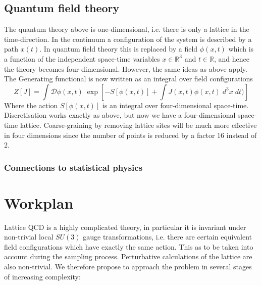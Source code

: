 \documentclass[11pt]{article}
\renewcommand{\vec}[1]{{#1}}
\begin{document}
\subsection{Quantum field theory}\label{sec:QFT}
The quantum theory above is one-dimensional, i.e. there is only a lattice in the time-direction. In the continuum a configuration of the system is described by a path $x(t)$. In quantum field theory this is replaced by a field $\phi(\vec{x},t)$ which is a function of the independent space-time variables $\vec{x}\in\mathbb{R}^3$ and $t\in\mathbb{R}$, and hence the theory becomes four-dimensional. However, the same ideas as above apply. The Generating functional is now written as an integral over field configurations
\begin{equation}
Z[J] = \int\mathcal{D}\phi(\vec{x},t)\;\exp\left[-S[\phi(\vec{x},t)]+\int
  J(\vec{x},t)\phi(\vec{x},t)\;d^3\vec{x}\;dt)\right]
\end{equation}
Where the action $S[\phi(\vec{x},t)]$ is an integral over four-dimensional space-time. Discretisation works exactly as above, but now we have a four-dimensional space-time lattice. Coarse-graining by removing lattice sites will be much more effective in four dimensions since the number of points is reduced by a factor 16 instead of 2.
\subsubsection{Connections to statistical physics}

\section{Workplan}
Lattice QCD is a highly complicated theory, in particular it is invariant under non-trivial local $SU(3)$ gauge transformations, i.e. there are certain equivalent field configurations which have exactly the same action. This as to be taken into account during the sampling process. Perturbative calculations of the lattice are also non-trivial. We therefore propose to approach the problem in several stages of increasing complexity:
\end{document}

